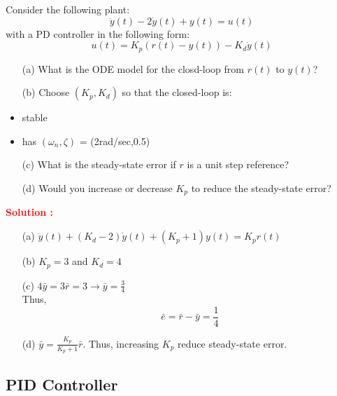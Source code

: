 \documentclass[12pt]{article}
\begin{document}
Consider the following plant:
\begin{equation}
    \ddot{y}(t) - 2\dot{y}(t) + y(t) = u(t)
\end{equation}
with a PD controller in the following form:
\begin{equation}
    u(t) = K_p(r(t)-y(t))-K_d \dot{y}(t)
\end{equation}
\begin{itemize}
    \item[(a)] What is the ODE model for the closd-loop from \(r(t)\) to \(y(t)\)?
    \item[(b)] Choose \((K_p,K_d)\) so that the closed-loop is: 
    \item stable
    \item has \((\omega_n,\zeta)\) = (2rad/sec,0.5)
    \item[(c)] What is the steady-state error if \(r\) is a unit step reference?
    \item[(d)] Would you increase or decrease \(K_p\) to reduce the steady-state error?
\end{itemize}
\textbf{\textcolor{red}{Solution :}} 
\begin{itemize}
    \item[(a)] \(\ddot{y}(t) + (K_d-2) \dot{y}(t) + (K_p+1)y(t) = K_p r(t)\)
    \item[(b)] \(K_p = 3\) and \(K_d = 4\)
    \item[(c)] \(4 \bar{y} = 3 \bar{r} = 3 \rightarrow \bar{y} = \frac{3}{4}\) \\
    Thus,
    \begin{equation}
        \bar{e} = \bar{r} - \bar{y} = \frac{1}{4}
    \end{equation}
    \item[(d)] \(\bar{y} = \frac{K_p}{K_p + 1} \bar{r}\).
    Thus, increasing \(K_p\) reduce steady-state error.
\end{itemize}

\clearpage
\subsection{PID Controller}
\end{document}
